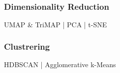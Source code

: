 \subsubsection{Dimensionality Reduction}
UMAP \& TriMAP | PCA | t-SNE

\subsubsection{Clustrering}
HDBSCAN | Agglomerative k-Means